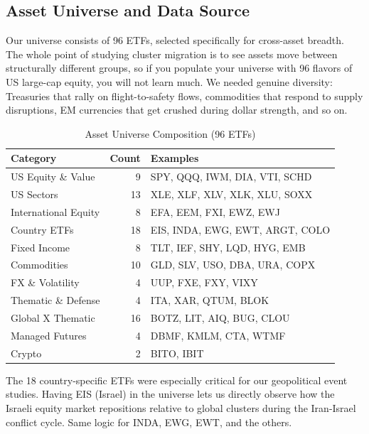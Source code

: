 \documentclass[12pt, letterpaper]{article}
\begin{document}
\subsection{Asset Universe and Data Source}

Our universe consists of 96 ETFs, selected specifically for cross-asset breadth. The whole point of studying cluster migration is to see assets move between structurally different groups, so if you populate your universe with 96 flavors of US large-cap equity, you will not learn much. We needed genuine diversity: Treasuries that rally on flight-to-safety flows, commodities that respond to supply disruptions, EM currencies that get crushed during dollar strength, and so on.

\begin{table}[H]
\centering
\caption{Asset Universe Composition (96 ETFs)}
\begin{tabular}{@{}lrl@{}}
\toprule
\textbf{Category} & \textbf{Count} & \textbf{Examples} \\
\midrule
US Equity \& Value & 9 & SPY, QQQ, IWM, DIA, VTI, SCHD \\
US Sectors & 13 & XLE, XLF, XLV, XLK, XLU, SOXX \\
International Equity & 8 & EFA, EEM, FXI, EWZ, EWJ \\
Country ETFs & 18 & EIS, INDA, EWG, EWT, ARGT, COLO \\
Fixed Income & 8 & TLT, IEF, SHY, LQD, HYG, EMB \\
Commodities & 10 & GLD, SLV, USO, DBA, URA, COPX \\
FX \& Volatility & 4 & UUP, FXE, FXY, VIXY \\
Thematic \& Defense & 4 & ITA, XAR, QTUM, BLOK \\
Global X Thematic & 16 & BOTZ, LIT, AIQ, BUG, CLOU \\
Managed Futures & 4 & DBMF, KMLM, CTA, WTMF \\
Crypto & 2 & BITO, IBIT \\
\bottomrule
\end{tabular}
\end{table}

The 18 country-specific ETFs were especially critical for our geopolitical event studies. Having EIS (Israel) in the universe lets us directly observe how the Israeli equity market repositions relative to global clusters during the Iran-Israel conflict cycle. Same logic for INDA, EWG, EWT, and the others.
\end{document}
